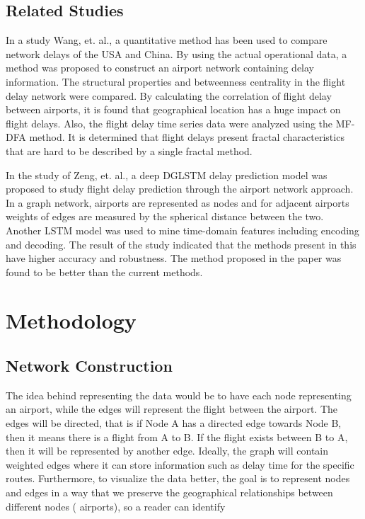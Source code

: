 \documentclass[sigconf,nonacm]{acmart}
\begin{document}
\subsection{Related Studies}
In a study Wang, et. al.\cite{Wang2020}, a quantitative method has been used to compare network delays of the USA and China. By using the actual operational data, a method was proposed to construct an airport network containing delay information. The structural properties and betweenness centrality in the flight delay network were compared. By calculating the correlation of flight delay between airports, it is found that geographical location has a huge impact on flight delays. Also, the flight delay time series data were analyzed using the MF-DFA method. It is determined that flight delays present fractal characteristics that are hard to be described by a single fractal method. 


In the study of Zeng, et. al.\cite{Zeng2021}, a deep DGLSTM delay prediction model was proposed to study flight delay prediction through the airport network approach. In a graph network, airports are represented as nodes and for adjacent airports weights of edges are measured by the spherical distance between the two. Another LSTM model was used to mine time-domain features including encoding and decoding. The result of the study indicated that the methods present in this have higher accuracy and robustness. The method proposed in the paper was found to be better than the current methods. 


\section{Methodology}
\subsection{Network Construction}
The idea behind representing the data would be to have each node representing an airport, while the edges will represent the flight between the airport. The edges will be directed, that is if Node A has a directed edge towards Node B, then it means there is a flight from A to B. If the flight exists between B to A, then it will be represented by another edge. Ideally, the graph will contain weighted edges where it can store information such as delay time for the specific routes. Furthermore, to visualize the data better, the goal is to represent nodes and edges in a way that we preserve the geographical relationships between different nodes ( airports), so a reader can identify
\end{document}
